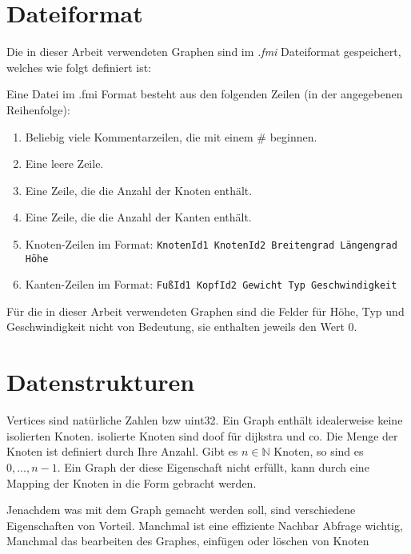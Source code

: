 \section{Dateiformat}

Die in dieser Arbeit verwendeten Graphen sind im \emph{.fmi} Dateiformat gespeichert, welches wie folgt definiert ist:

\begin{definition}
    Eine Datei im .fmi Format besteht aus den folgenden Zeilen (in der angegebenen Reihenfolge):
    \begin{enumerate}
        \item
              Beliebig viele Kommentarzeilen, die mit einem \# beginnen.

        \item
              Eine leere Zeile.

        \item
              Eine Zeile, die die Anzahl der Knoten enthält.

        \item
              Eine Zeile, die die Anzahl der Kanten enthält.

        \item
              Knoten-Zeilen im Format: \texttt{KnotenId1 KnotenId2 Breitengrad Längengrad Höhe}

        \item
              Kanten-Zeilen im Format: \texttt{FußId1 KopfId2 Gewicht Typ Geschwindigkeit}

    \end{enumerate}
\end{definition}

Für die in dieser Arbeit verwendeten Graphen sind die Felder für Höhe, Typ und Geschwindigkeit nicht von Bedeutung, sie enthalten jeweils den Wert 0.

\section{Datenstrukturen}

Vertices sind natürliche Zahlen bzw uint32.
Ein Graph enthält idealerweise keine isolierten Knoten.
isolierte Knoten sind doof für dijkstra und co.
Die Menge der Knoten ist definiert durch Ihre Anzahl.
Gibt es $n \in \mathbb{N}$ Knoten, so sind es $0, \dotsc, n - 1$.
Ein Graph der diese Eigenschaft nicht erfüllt, kann durch eine Mapping der Knoten in die Form gebracht werden.

Jenachdem was mit dem Graph gemacht werden soll, sind verschiedene Eigenschaften von Vorteil.
Manchmal ist eine effiziente Nachbar Abfrage wichtig,
Manchmal das bearbeiten des Graphes, einfügen oder löschen von Knoten

